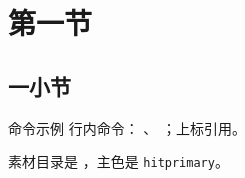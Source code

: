\documentclass[aspectratio=169]{ctexbeamer}
\title{\themetitle}
\author{\themeauthor}
\institute{哈尔滨工业大学}
\begin{document}
\TitleSlide

\BlueTitleSlide

\OutlineSlide

\section{第一节}

\subsection{一小节}

\begin{frame}{命令示例}
  行内命令：  、  ；上标引用。

  素材目录是 \hitvipath，主色是 \texttt{hitprimary}。
\end{frame}


\end{document}
